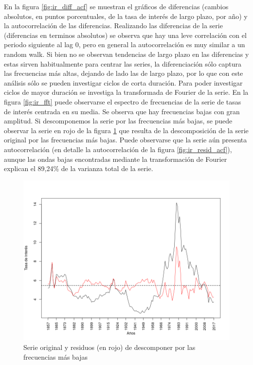 \documentclass[a4paper]{article}
\begin{document}
En la figura \ref{fig:ir_diff_acf} se muestran el gráficos de diferencias (cambios absolutos, en puntos porcentuales, de la tasa de interés de largo plazo, por año) y la autocorrelación de las diferencias. Realizando las diferencias de la serie (diferencias en terminos absolutos) se observa que hay una leve correlación con el periodo siguiente al lag 0, pero en general la autocorrelación es muy similar a un random walk. Si bien no se observan tendencias de largo plazo en las diferencias y estas sirven habitualmente para centrar las series, la diferenciación sólo captura las frecuencias más altas, dejando de lado las de largo plazo, por lo que con este análisis sólo se pueden investigar ciclos de corta duración. Para poder investigar ciclos de mayor duración se investiga la transformada de Fourier de la serie. En la figura \ref{fig:ir_fft} puede observarse el espectro de frecuencias de la serie de tasas de interés centrada en su media.
Se observa que hay frecuencias bajas con gran amplitud. Si descomponemos la serie por las frecuencias más bajas, se puede observar la serie en rojo de la figura \ref{fig:ir_orig_resid} que resulta de la descomposición de la serie original por las frecuencias más bajas. Puede observarse que la serie aún presenta autocorrelación (en detalle la autocorrelación de la figura \ref{fig:ir_resid_acf}), aunque las ondas bajas encontradas mediante la transformación de Fourier explican el 89,24\% de la varianza total de la serie.

\begin{figure}[H]
	\centering
	\includegraphics[width=0.8\linewidth]{ir_orig_resid.png}
	\caption{Serie original y residuos (en rojo) de descomponer por las frecuencias más bajas} 	
	\label{fig:ir_orig_resid}
\end{figure}
\end{document}
